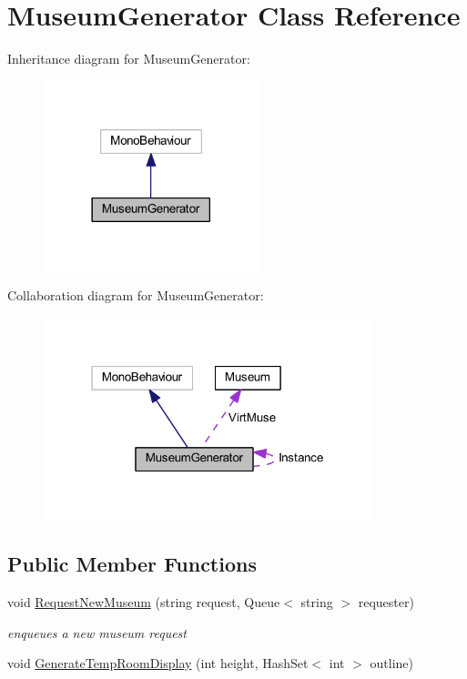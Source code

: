 \hypertarget{class_museum_generator}{}\section{Museum\+Generator Class Reference}
\label{class_museum_generator}


Inheritance diagram for Museum\+Generator\+:
\nopagebreak
\begin{figure}[H]
\begin{center}
\leavevmode
\includegraphics[width=177pt]{class_museum_generator__inherit__graph}
\end{center}
\end{figure}


Collaboration diagram for Museum\+Generator\+:
\nopagebreak
\begin{figure}[H]
\begin{center}
\leavevmode
\includegraphics[width=271pt]{class_museum_generator__coll__graph}
\end{center}
\end{figure}
\subsection*{Public Member Functions}
\begin{DoxyCompactItemize}
\item 
void \mbox{\hyperlink{class_museum_generator_a5ead852effaa81309fe98b4d61fe9759}{Request\+New\+Museum}} (string request, Queue$<$ string $>$ requester)
\begin{DoxyCompactList}\small\item\em enqueues a new museum request \end{DoxyCompactList}\item 
void \mbox{\hyperlink{class_museum_generator_a65ac409691646fa2f92ee9b84294ac57}{Generate\+Temp\+Room\+Display}} (int height, Hash\+Set$<$ int $>$ outline)
\end{DoxyCompactItemize}
